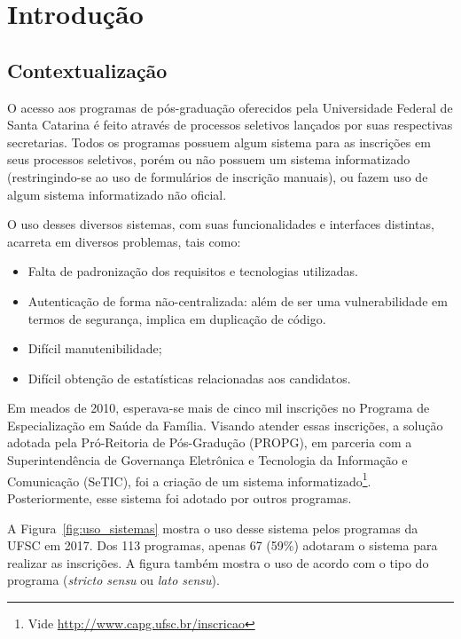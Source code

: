 \documentclass[
  10.5pt,				  %
	openright,			%
	twoside,			  %
  a5paper,
  chapter=TITLE,	%
	section=TITLE,	%
  hyphens,        %
	english,        %
	brazil          %
]{abntex2}
\begin{document}
\setcounter{page}{5}

\chapter{Introdução}

\section{Contextualização}

O acesso aos programas de pós-graduação oferecidos pela Universidade Federal de Santa Catarina é feito através de processos seletivos lançados por suas respectivas secretarias. Todos os programas possuem algum sistema para as inscrições em seus processos seletivos, porém ou não possuem um sistema informatizado (restringindo-se ao uso de formulários de inscrição manuais), ou fazem uso de algum sistema informatizado não oficial. 

O uso desses diversos sistemas, com suas funcionalidades e interfaces distintas, acarreta em diversos problemas, tais como:
\begin{itemize}
  \item Falta de padronização dos requisitos e tecnologias utilizadas.
  \item Autenticação de forma não-centralizada: além de ser uma vulnerabilidade em termos de segurança, implica em duplicação de código.
  \item Difícil manutenibilidade;
  \item Difícil obtenção de estatísticas relacionadas aos candidatos.
\end{itemize}

Em meados de 2010, esperava-se mais de cinco mil inscrições no Programa de Especialização em Saúde da Família. Visando atender essas inscrições, a solução adotada pela Pró-Reitoria de Pós-Gradução (PROPG), em parceria com a Superintendência de Governança Eletrônica e Tecnologia da Informação e Comunicação (SeTIC), foi a criação de um sistema informatizado\footnote{Vide \href{http://www.capg.ufsc.br/inscricao}{http://www.capg.ufsc.br/inscricao}}. Posteriormente, esse sistema foi adotado por outros programas.

A Figura~\ref{fig:uso_sistemas} mostra o uso desse sistema pelos programas da UFSC em 2017. Dos 113 programas, apenas 67 (59\%) adotaram o sistema para realizar as inscrições. A figura também mostra o uso de acordo com o tipo do programa (\emph{stricto sensu} ou \emph{lato sensu}).
\end{document}
